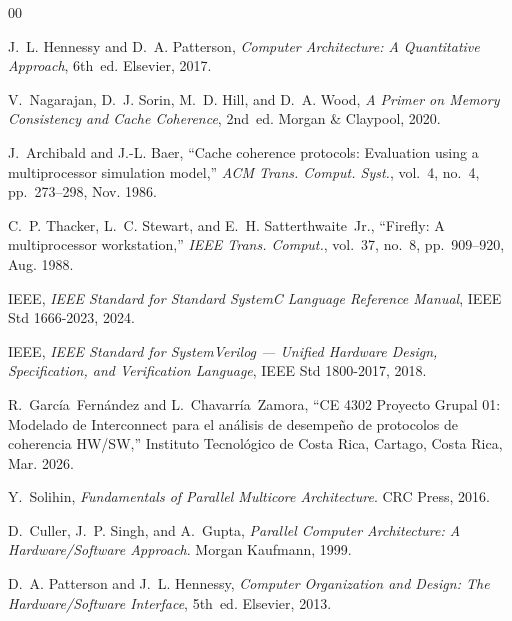 \documentclass[journal,trans]{IEEEtran}
\begin{document}

\begin{thebibliography}{00}
 
J.~L. Hennessy and D.~A. Patterson,
\emph{Computer Architecture: A Quantitative Approach}, 6th~ed.
Elsevier, 2017.
 
V.~Nagarajan, D.~J. Sorin, M.~D. Hill, and D.~A. Wood,
\emph{A Primer on Memory Consistency and Cache Coherence}, 2nd~ed.
Morgan \& Claypool, 2020.
 
J.~Archibald and J.-L. Baer,
``Cache coherence protocols: Evaluation using a multiprocessor simulation
model,''
\emph{ACM Trans. Comput. Syst.}, vol.~4, no.~4, pp.~273--298, Nov. 1986.
 
C.~P. Thacker, L.~C. Stewart, and E.~H. Satterthwaite~Jr.,
``Firefly: A multiprocessor workstation,''
\emph{IEEE Trans. Comput.}, vol.~37, no.~8, pp.~909--920, Aug. 1988.
 
IEEE,
\emph{IEEE Standard for Standard SystemC Language Reference Manual},
IEEE Std 1666-2023, 2024.
 
IEEE,
\emph{IEEE Standard for SystemVerilog --- Unified Hardware Design,
Specification, and Verification Language},
IEEE Std 1800-2017, 2018.
 
R.~Garc\'ia~Fern\'andez and L.~Chavarr\'ia~Zamora,
``CE 4302 Proyecto Grupal 01: Modelado de Interconnect para el an\'alisis
de desempe\~no de protocolos de coherencia HW/SW,''
Instituto Tecnol\'ogico de Costa Rica, Cartago, Costa Rica, Mar. 2026.
 
Y.~Solihin,
\emph{Fundamentals of Parallel Multicore Architecture}.
CRC Press, 2016.
 
D.~Culler, J.~P. Singh, and A.~Gupta,
\emph{Parallel Computer Architecture: A Hardware/Software Approach}.
Morgan Kaufmann, 1999.
 
D.~A. Patterson and J.~L. Hennessy,
\emph{Computer Organization and Design: The Hardware/Software Interface},
5th~ed. Elsevier, 2013.
\end{thebibliography}
\end{document}
